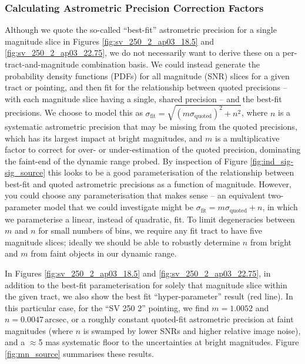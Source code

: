 \documentclass[SE,lsstdraft,authoryear,toc]{lsstdoc}
\begin{document}
\subsubsection{Calculating Astrometric Precision Correction Factors}
Although we quote the so-called ``best-fit'' astrometric precision for a single magnitude slice in Figures \ref{fig:sv_250_2_ap03_18.5} and \ref{fig:sv_250_2_ap03_22.75}, we do not necessarily want to derive these on a per-tract-and-magnitude combination basis.
We could instead generate the probability density functions (PDFs) for all magnitude (SNR) slices for a given tract or pointing, and then fit for the relationship between quoted precisions -- with each magnitude slice having a single, shared precision -- and the best-fit precisions.
We choose to model this as $\sigma_\mathrm{fit} = \sqrt{(m \sigma_\mathrm{quoted})^2 + n^2}$, where $n$ is a systematic astrometric precision that may be missing from the quoted precisions, which has its largest impact at bright magnitudes, and $m$ is a multiplicative factor to correct for over- or under-estimation of the quoted precision, dominating the faint-end of the dynamic range probed.
By inspection of Figure \ref{fig:ind_sig-sig_source} this looks to be a good parameterisation of the relationship between best-fit and quoted astrometric precisions as a function of magnitude.
However, you could choose any parameterisation that makes sense -- an equivalent two-parameter model that we could investigate might be $\sigma_\mathrm{fit} = m \sigma_\mathrm{quoted} + n$, in which we parameterise a linear, instead of quadratic, fit.
To limit degeneracies between $m$ and $n$ for small numbers of bins, we require any fit tract to have five magnitude slices; ideally we should be able to robustly determine $n$ from bright and $m$ from faint objects in our dynamic range.

In Figures \ref{fig:sv_250_2_ap03_18.5} and \ref{fig:sv_250_2_ap03_22.75}, in addition to the best-fit parameterisation for solely that magnitude slice within the given tract, we also show the best fit ``hyper-parameter'' result (red line).
In this particular case, for the ``SV 250 2'' pointing, we find $m = 1.0052$ and $n = 0.0047\,\mathrm{arcsec}$, or a roughly constant quoted-fit astrometric precision at faint magnitudes (where $n$ is swamped by lower SNRs and higher relative image noise), and a $\approx$5 mas systematic floor to the uncertainties at bright magnitudes.
Figure \ref{fig:mn_source} summarises these results.
\end{document}
